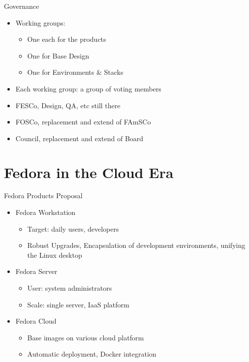 \documentclass{beamer}
\begin{document}
\begin{frame}{Governance}
  \begin{itemize}
    \item Working groups:
      \begin{itemize}
        \item One each for the products
        \item One for Base Design
        \item One for Environments \& Stacks
      \end{itemize}
    \item Each working group: a group of voting members
    \item FESCo, Design, QA, etc still there
    \item FOSCo, replacement and extend of FAmSCo
    \item Council, replacement and extend of Board
  \end{itemize}
\end{frame}

\section{Fedora in the Cloud Era}
\begin{frame}{Fedora Products Proposal}
  \begin{itemize}
    \item Fedora Workstation
      \begin{itemize}
        \item Target: daily users, developers
        \item Robust Upgrades, Encapsulation of development
          environments, unifying the Linux desktop
      \end{itemize}
    \item Fedora Server
      \begin{itemize}
        \item User: system administrators
        \item Scale: single server, IaaS platform
      \end{itemize}
    \item Fedora Cloud
      \begin{itemize}
        \item Base images on various cloud platform
        \item Automatic deployment, Docker integration
      \end{itemize}
  \end{itemize}

\end{frame}
\end{document}
